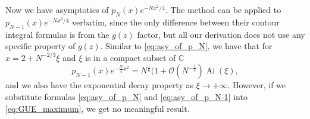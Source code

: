 \documentclass[11pt, a4paper]{article}
\numberwithin{equation}{section}
\newcommand{\bigO}{\mathcal{O}}
\newcommand{\compC}{\mathbb{C}}
\DeclareMathOperator{\Ai}{Ai}
\theoremstyle{definition}
\theoremstyle{remark}
\begin{document}
Now we have asymptotics of $p_N(x) e^{-Nx^2/4}$. The method can be applied to $p_{N - 1}(x) e^{-Nx^2/4}$ verbatim, since the only difference between their contour integral formulas is from the $g(z)$ factor, but all our derivation does not use any specific property of $g(z)$. Similar to \eqref{eq:asy_of_p_N}, we have that for $x = 2 + N^{-2/3}\xi$ and $\xi$ is in a compact subset of $\compC$
\begin{equation} \label{eq:asy_of_p_N-1}
  p_{N - 1}(x) e^{-\frac{N}{4}x^2} = N^{\frac{1}{6}} (1 + \bigO(N^{-\frac{1}{5}}) \Ai(\xi),
\end{equation}
and we also have the exponential decay property as $\xi \to +\infty$. However, if we substitute formulas \eqref{eq:asy_of_p_N} and \eqref{eq:asy_of_p_N-1} into \eqref{eq:GUE_maximum}, we get no meaningful result.
\end{document}
